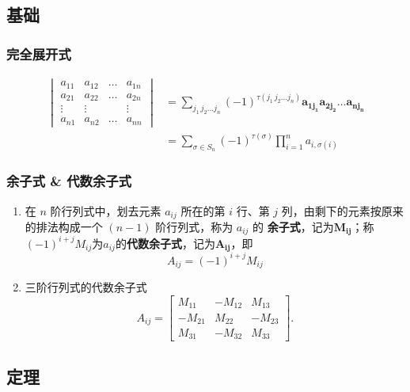 \documentclass[a4paper,12pt]{article}
\begin{document}
    \subsection{基础}

    \subsubsection{完全展开式}

    \begin{align*}
        \begin{vmatrix}
            a_{11} & a_{12} & \dots & a_{1n} \\
            a_{21} & a_{22} & \dots & a_{2n} \\
            \vdots & \vdots &       & \vdots \\
            a_{n1} & a_{n2} & \dots & a_{nn}
        \end{vmatrix}
        &= \sum_{j_1\,j_2\dots j_{n}} (-1)^{\tau(j_1\,j_2\dots j_n)} \mathbf{a_{1j_1}a_{2j_2}\dots a_{nj_n}} \\
        &= \sum_{\sigma \in S_n} (-1)^{\tau(\sigma)} \prod_{i=1}^{n} a_{i, \sigma(i)}
    \end{align*}

    \subsubsection{余子式 \& 代数余子式}

    \begin{enumerate}
        \item 在 $n$ 阶行列式中，划去元素 $a_{ij}$ 所在的第 $i$ 行、第 $j$ 列，由剩下的元素按原来的排法构成一个 $(n-1)$ 阶行列式，称为 $a_{ij}$ 的 \textbf{余子式}，记为$\mathbf{M_{ij}}$；称$(-1)^{i+j}M_{ij}$为$a_{ij}$的\textbf{代数余子式}，记为$\mathbf{A_{ij}}$，即
        \[
            A_{ij} = (-1)^{i+j}M_{ij}
        \]
        \item 三阶行列式的代数余子式
        \[
            A_{ij} =
            \begin{bmatrix}
                M_{11}  & -M_{12} & M_{13}  \\
                -M_{21} & M_{22}  & -M_{23} \\
                M_{31}  & -M_{32} & M_{33}
            \end{bmatrix}.
        \]
    \end{enumerate}

    \subsection{定理}
\end{document}
